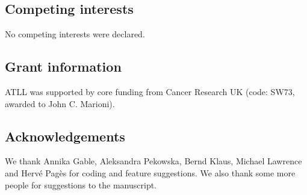 \documentclass[10pt,a4paper,twocolumn]{article}
\begin{document}
\subsection*{Competing interests}
No competing interests were declared.

\subsection*{Grant information}
ATLL was supported by core funding from Cancer Research UK (code: SW73, awarded to John C. Marioni).

\subsection*{Acknowledgements}
We thank Annika Gable, Aleksandra Pekowska, Bernd Klaus, Michael Lawrence and Herv\'e Pag\`es for coding and feature suggestions.
We also thank some more people for suggestions to the manuscript.

\nocite{*}
{\small
}
\end{document}
